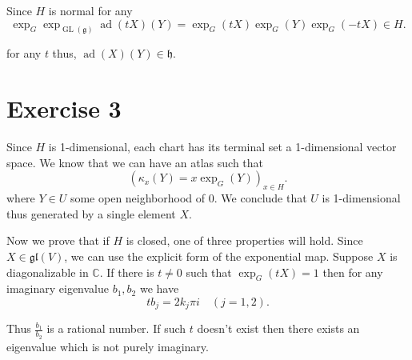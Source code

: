 \documentclass{article}
\numberwithin{equation}{section}
\DeclareMathOperator{\ad}{ad}
\DeclareMathOperator{\GL}{GL}
\begin{document}
Since $H$ is normal for any 
\begin{equation*}
\exp_G\exp_{\GL(\mathfrak{g})}\ad(tX)(Y) = \exp_G(tX)\exp_G(Y)\exp_G(-tX)\in H.
\end{equation*}

for any $t$ thus, $\ad(X)(Y)\in\mathfrak{h}$.


\section*{Exercise 3}
Since $H$ is 1-dimensional, each chart has its terminal set a 1-dimensional vector space. We know that we can have an atlas such that
\begin{equation*}
(\kappa_x(Y)=x\exp_G(Y))_{x\in H}.
\end{equation*}
where $Y\in U$ some open neighborhood of $0$. We conclude that $U$ is 1-dimensional thus generated by a single element $X$.\\
\par Now we prove that if $H$ is closed, one of three properties will hold. Since $X\in\mathfrak{gl}(V)$, we can use the explicit form of the exponential map. Suppose $X$ is diagonalizable in $\mathbb{C}$. If there is $t\not=0$ such that $\exp_G(tX)=1$ then for any imaginary eigenvalue $b_1,b_2$ we have
\begin{equation*}
tb_j = 2k_j\pi i\quad(j=1,2).
\end{equation*}

Thus ${\frac {b_1} {b_2}}$ is a rational number. If such $t$ doesn't exist then there exists an eigenvalue which is not purely imaginary. 
\end{document}
